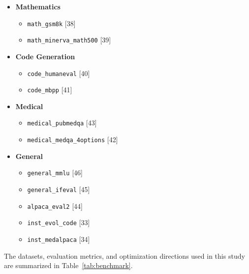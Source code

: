 \documentclass{article}
\begin{document}
\begin{itemize}

\item \textbf{Mathematics}
\begin{itemize}
    \item \texttt{math\_gsm8k} [38]
    \item \texttt{math\_minerva\_math500} [39]
\end{itemize}

\item \textbf{Code Generation}
\begin{itemize}
    \item \texttt{code\_humaneval} [40]
    \item \texttt{code\_mbpp} [41]
\end{itemize}

\item \textbf{Medical}
\begin{itemize}
    \item \texttt{medical\_pubmedqa} [43]
    \item \texttt{medical\_medqa\_4options} [42]
\end{itemize}

\item \textbf{General}
\begin{itemize}
    \item \texttt{general\_mmlu} [46]
    \item \texttt{general\_ifeval} [45]
    \item \texttt{alpaca\_eval2} [44]
    \item \texttt{inst\_evol\_code} [33]
    \item \texttt{inst\_medalpaca} [34]
\end{itemize}

\end{itemize}


The datasets, evaluation metrics, and optimization directions used in this study are summarized in Table~\ref{tab:benchmark}.
\end{document}
